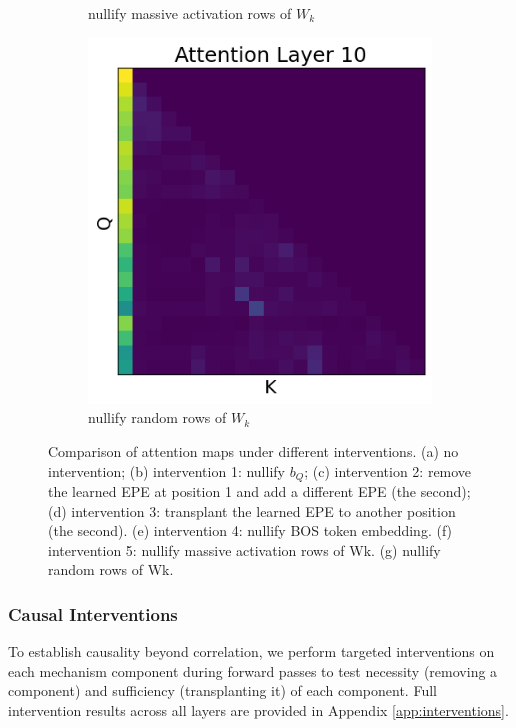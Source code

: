 \documentclass[11pt]{article}
\begin{document}
\begin{figure}[t!]
\begin{subfigure}[t]{0.22\textwidth}
    \caption{nullify massive activation rows of $W_k$}
    \label{fig:intervention5}
  \end{subfigure}\hspace{\bottomsep}
  \begin{subfigure}[t]{0.22\textwidth}
    \centering
    \includegraphics[width=0.86\linewidth]{figures/obs4_intervention5_2.png}
    \caption{nullify random rows of $W_k$}
    \label{fig:intervention5_2}
  \end{subfigure}


  \caption{Comparison of attention maps under different interventions. (a) no intervention; (b) intervention 1: nullify $b_Q$; (c) intervention 2: remove the learned EPE at position 1 and add a different EPE (the second); (d) intervention 3: transplant the learned EPE to another position (the second). (e) intervention 4: nullify BOS token embedding. (f) intervention 5: nullify massive activation rows of Wk. (g) nullify random rows of Wk.}
  \label{fig:interventions_comparison}
\end{figure}


\subsubsection{Causal Interventions}
\label{sec:interventions}
To establish causality beyond correlation, we perform targeted 
interventions on each mechanism component during forward passes to test necessity (removing a component) and sufficiency (transplanting it) of each component. Full intervention results across all layers are provided in Appendix \ref{app:interventions}.
\end{document}
